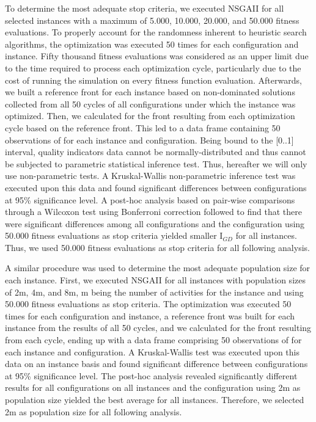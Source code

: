 \documentclass[conference]{IEEEtran}
\begin{document}
To determine the most adequate stop criteria, we executed NSGAII for all selected instances with a maximum of 5.000, 10.000, 20.000, and 50.000 fitness evaluations. To properly account for the randomness inherent to heuristic search algorithms, the optimization was executed 50 times for each configuration and instance. Fifty thousand fitness evaluations was considered as an upper limit due to the time required to process each optimization cycle, particularly due to the cost of running the simulation on every fitness function evaluation. Afterwards, we built a reference front for each instance based on non-dominated solutions collected from all 50 cycles of all configurations under which the instance was optimized. Then, we calculated  for the front resulting from each optimization cycle based on the reference front. This led to a data frame containing 50 observations of  for each instance and configuration. Being bound to the [0..1] interval, quality indicators data cannot be normally-distributed and thus cannot be subjected to parametric statistical inference test. Thus, hereafter we will only use non-parametric tests. A Kruskal-Wallis non-parametric inference test was executed upon this data and found significant differences between configurations at 95\% significance level. A post-hoc analysis based on pair-wise comparisons through a Wilcoxon test using Bonferroni correction followed to find that there were significant differences among all configurations and the configuration using 50.000 fitness evaluations as stop criteria yielded smaller I$_{GD}$  for all instances. Thus, we used 50.000 fitness evaluations as stop criteria for all following analysis.

A similar procedure was used to determine the most adequate population size for each instance. First, we executed NSGAII for all instances with population sizes of 2m, 4m, and 8m, m being the number of activities for the instance and using 50.000 fitness evaluations as stop criteria. The optimization was executed 50 times for each configuration and instance, a reference front was built for each instance from the results of all 50 cycles, and we calculated  for the front resulting from each cycle, ending up with a data frame comprising 50 observations of  for each instance and configuration. A Kruskal-Wallis test was executed upon this data on an instance basis and found significant difference between configurations at 95\% significance level. The post-hoc analysis revealed significantly different results for all configurations on all instances and the configuration using 2m as population size yielded the best average  for all instances. Therefore, we selected 2m as population size for all following analysis.
\end{document}
